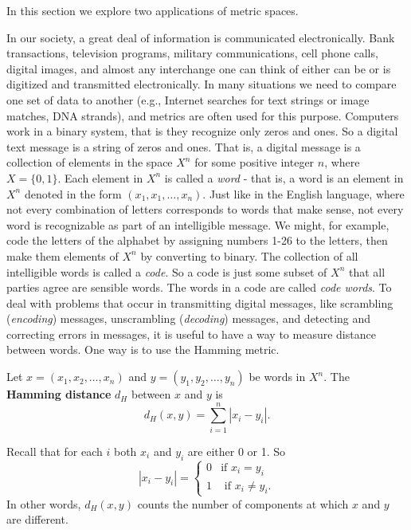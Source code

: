  \label{chap:metric_spaces_apps}

\label{sec_met_space_app}

In this section we explore two applications of metric spaces.  

\label{sec_hamming}

In our society, a great deal of information is communicated electronically. Bank transactions, television programs, military communications, cell phone calls, digital images, and almost any interchange one can think of either can be or is digitized and transmitted electronically. In many situations we need to compare one set of data to another (e.g., Internet searches for text strings or image matches, DNA strands), and metrics are often used for this purpose. Computers work in a binary system, that is they recognize only zeros and ones. So a digital text message is a string of zeros and ones. That is, a digital message is a collection of  elements in the space $X^n$ for some positive integer $n$, where $X = \{0,1\}$. Each element in $X^n$ is called a \emph{word} - that is, a word is an element in $X^n$ denoted in the form $(x_1, x_1, \ldots, x_n)$. Just like in the English language, where not every combination of letters corresponds to words that make sense, not every word is recognizable as part of an intelligible message. We might, for example, code the letters of the alphabet by assigning numbers 1-26 to the letters, then make them elements of $X^n$ by converting to binary. The collection of all intelligible words is called a \emph{code}. So a code is just some subset of $X^n$ that all parties agree are sensible words. The words in a code are called \emph{code words}. To deal with problems that occur in transmitting digital messages, like scrambling (\emph{encoding}) messages, unscrambling (\emph{decoding}) messages, and detecting and correcting errors in messages, it is useful to have a way to measure distance between words. One way is to use the Hamming metric. 

\begin{definition} Let $x = (x_1, x_2, \ldots, x_n)$ and $y = (y_1, y_2, \ldots, y_n)$ be words in $X^n$. The \textbf{Hamming distance}  $d_H$ between $x$ and $y$ is 
\[d_H(x,y) = \sum_{i=1}^n | x_i-y_i |.\]
\end{definition}

Recall that for each $i$ both $x_i$ and $y_i$ are either 0 or 1. So 
\[| x_i-y_i | = \begin{cases} 0 &\text{if } x_i=y_i \\ 1 &\text{ if } x_i \neq y_i. \end{cases}\]
In other words, $d_H(x,y)$ counts the number of components at which $x$ and $y$ are different.

